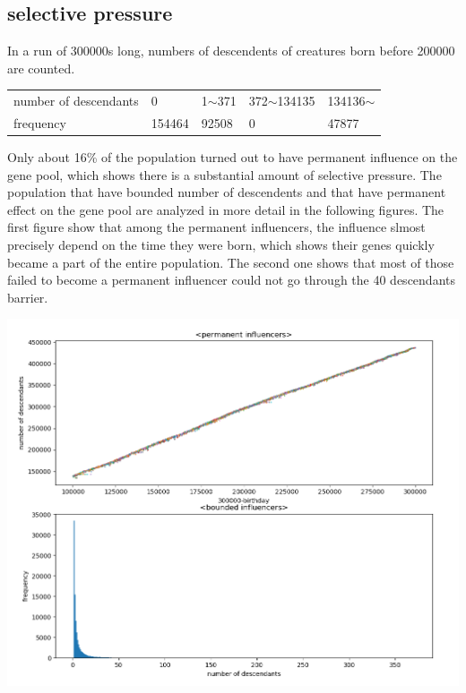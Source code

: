 \documentclass{amsart}
\theoremstyle{definition}
\theoremstyle{remark}
\numberwithin{equation}{section}
\begin{document}
\subsection{selective pressure}
In a run of 300000s long, numbers of descendents of creatures born before 200000 are counted. 
\begin{table}[htb]
\begin{tabular}{lllll}
number of descendants&0&1$\sim$371&372$\sim$134135&134136$\sim$\\
frequency&154464&92508&0&47877
\end{tabular}
\end{table}

Only about 16\% of the population turned out to have permanent influence on the gene pool, which shows there is a substantial amount of selective pressure. The population that have bounded number of descendents and that have permanent effect on the gene pool are analyzed in more detail in the following figures. The first figure show that among the permanent influencers, the influence slmost precisely depend on the time they were born, which shows their genes quickly became a part of the entire population. The second one shows that most of those failed to become a permanent influencer could not go through the 40 descendants barrier.
\begin{center}
\includegraphics[scale=0.3]{images/detail.png}
\end{center}





\end{document}
